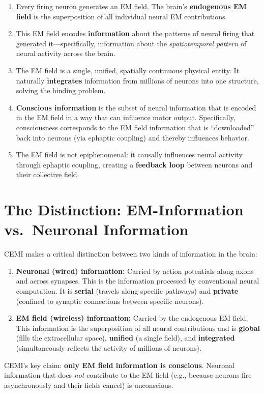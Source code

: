 \documentclass[11pt,a4paper]{report}
\begin{document}
\begin{principlebox}
\begin{enumerate}[leftmargin=1.5em]
  \item Every firing neuron generates an EM field. The brain's \textbf{endogenous EM field} is the superposition of all individual neural EM contributions.
  \item This EM field encodes \textbf{information} about the patterns of neural firing that generated it---specifically, information about the \emph{spatiotemporal pattern} of neural activity across the brain.
  \item The EM field is a single, unified, spatially continuous physical entity. It naturally \textbf{integrates} information from millions of neurons into one structure, solving the binding problem.
  \item \textbf{Conscious information} is the subset of neural information that is encoded in the EM field in a way that can influence motor output. Specifically, consciousness corresponds to the EM field information that is ``downloaded'' back into neurons (via ephaptic coupling) and thereby influences behavior.
  \item The EM field is not epiphenomenal: it causally influences neural activity through ephaptic coupling, creating a \textbf{feedback loop} between neurons and their collective field.
\end{enumerate}
\end{principlebox}

\section{The Distinction: EM-Information vs.\ Neuronal Information}

CEMI makes a critical distinction between two kinds of information in the brain:

\begin{fieldbox}
\begin{enumerate}[leftmargin=1.5em]
  \item \textbf{Neuronal (wired) information:} Carried by action potentials along axons and across synapses. This is the information processed by conventional neural computation. It is \textbf{serial} (travels along specific pathways) and \textbf{private} (confined to synaptic connections between specific neurons).
  \item \textbf{EM field (wireless) information:} Carried by the endogenous EM field. This information is the superposition of all neural contributions and is \textbf{global} (fills the extracellular space), \textbf{unified} (a single field), and \textbf{integrated} (simultaneously reflects the activity of millions of neurons).
\end{enumerate}
CEMI's key claim: \textbf{only EM field information is conscious}. Neuronal information that does \emph{not} contribute to the EM field (e.g., because neurons fire asynchronously and their fields cancel) is unconscious.
\end{fieldbox}
\end{document}

